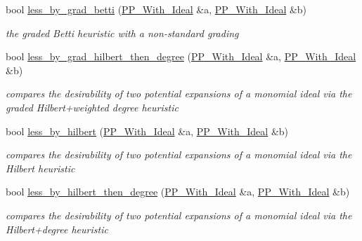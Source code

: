 \begin{DoxyCompactItemize}
bool \hyperlink{namespace_dynamic___engine_a8c67515d04de029583ba590b2ca4d6e4}{less\+\_\+by\+\_\+grad\+\_\+betti} (\hyperlink{group___g_b_computation_class_dynamic___engine_1_1_p_p___with___ideal}{P\+P\+\_\+\+With\+\_\+\+Ideal} \&a, \hyperlink{group___g_b_computation_class_dynamic___engine_1_1_p_p___with___ideal}{P\+P\+\_\+\+With\+\_\+\+Ideal} \&b)
\begin{DoxyCompactList}\small\item\em the graded Betti heuristic with a non-\/standard grading \end{DoxyCompactList}\item 
bool \hyperlink{namespace_dynamic___engine_a9a6525d0f50053349c5573422f025c22}{less\+\_\+by\+\_\+grad\+\_\+hilbert\+\_\+then\+\_\+degree} (\hyperlink{group___g_b_computation_class_dynamic___engine_1_1_p_p___with___ideal}{P\+P\+\_\+\+With\+\_\+\+Ideal} \&a, \hyperlink{group___g_b_computation_class_dynamic___engine_1_1_p_p___with___ideal}{P\+P\+\_\+\+With\+\_\+\+Ideal} \&b)
\begin{DoxyCompactList}\small\item\em compares the desirability of two potential expansions of a monomial ideal via the graded Hilbert+weighted degree heuristic \end{DoxyCompactList}\item 
bool \hyperlink{namespace_dynamic___engine_acb9d5de295d3d96abfa40dd47ae41c1f}{less\+\_\+by\+\_\+hilbert} (\hyperlink{group___g_b_computation_class_dynamic___engine_1_1_p_p___with___ideal}{P\+P\+\_\+\+With\+\_\+\+Ideal} \&a, \hyperlink{group___g_b_computation_class_dynamic___engine_1_1_p_p___with___ideal}{P\+P\+\_\+\+With\+\_\+\+Ideal} \&b)
\begin{DoxyCompactList}\small\item\em compares the desirability of two potential expansions of a monomial ideal via the Hilbert heuristic \end{DoxyCompactList}\item 
bool \hyperlink{namespace_dynamic___engine_afe48703afece2137e511824b00ccad39}{less\+\_\+by\+\_\+hilbert\+\_\+then\+\_\+degree} (\hyperlink{group___g_b_computation_class_dynamic___engine_1_1_p_p___with___ideal}{P\+P\+\_\+\+With\+\_\+\+Ideal} \&a, \hyperlink{group___g_b_computation_class_dynamic___engine_1_1_p_p___with___ideal}{P\+P\+\_\+\+With\+\_\+\+Ideal} \&b)
\begin{DoxyCompactList}\small\item\em compares the desirability of two potential expansions of a monomial ideal via the Hilbert+degree heuristic \end{DoxyCompactList}\item 

\end{DoxyCompactItemize}
